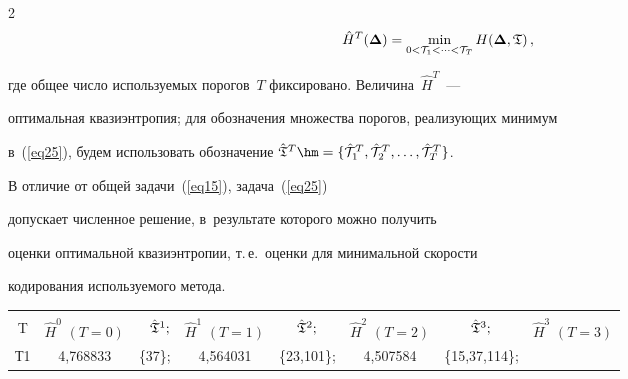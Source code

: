 \begin{multicols}{2}
\begin{equation}

\label{eq25}

\hat{H}^{T}(\boldsymbol{\Delta}) =

\min\limits_{0<{\cal T}_1<\dots<{\cal T}_T}  H(\boldsymbol{\Delta},{\frak T})\,,

\end{equation}

где общее число используемых порогов~$T$ фиксировано. Величина~$\hat{H}^{T}$~--- 

оптимальная квазиэнтропия; для обозначения множества порогов, реализующих минимум 

в~(\ref{eq25}), будем использовать обозначение $\hat{\frak T}^T\hm=

\{{\hat{\cal T}}^{T}_{1}, {\hat{\cal T}}^{T}_{2},\dots, {\hat{\cal T}}^{T}_{T}\}$.



В отличие от общей задачи~(\ref{eq15}), задача~(\ref{eq25}) 

допускает численное решение, в~результате которого можно получить 

оценки оптимальной квазиэнтропии, т.\,е.\ оценки для минимальной скорости 

кодирования используемого метода.




\begin{table}\small

\begin{center}


\label{tab1}

\vspace{2ex}

\begin{tabular}{|c|c|rc|cc|cc|}

\hline

&&&&&&&\\[-9pt]

 T & $\hat{H}^0$ $(T=0)$ & $\hat{\frak T}^1;$ & $\hat{H}^1$ $(T=1)$ &

$\hat{\frak T}^2;$ & $\hat{H}^2$ $(T=2)$ & $\hat{\frak T}^3;$ & 

$\hat{H}^3$ $(T=3)$\\

\hline

Т1 & 4,768833 & \{37\}; & 4,564031 & \{23,101\}; & 4,507584 & \{15,37,114\}; & 


\end{tabular}
\end{center}
\end{table}
\end{multicols}
